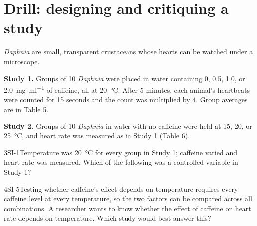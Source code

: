 \documentclass[11pt]{article}
\begin{document}
\section{Drill: designing and critiquing a study}

\textit{Daphnia} are small, transparent crustaceans whose hearts can be watched under a microscope.

\textbf{Study 1.} Groups of 10 \textit{Daphnia} were placed in water containing 0, 0.5, 1.0, or \SI{2.0}{\milli\gram\per\milli\litre} of caffeine, all at \SI{20}{\celsius}. After 5 minutes, each animal's heartbeats were counted for 15 seconds and the count was multiplied by 4. Group averages are in Table 5.

\textbf{Study 2.} Groups of 10 \textit{Daphnia} in water with no caffeine were held at 15, 20, or \SI{25}{\celsius}, and heart rate was measured as in Study 1 (Table 6).

\begin{minipage}[t]{0.48\linewidth}
\end{minipage}\hfill
\begin{minipage}[t]{0.48\linewidth}
\end{minipage}
\passageend

\begin{q}{3}{SI-1}{Temperature was \SI{20}{\celsius} for every group in Study 1; caffeine varied and heart rate was measured.}
Which of the following was a controlled variable in Study 1?
\end{q}

\begin{q}{4}{SI-5}{Testing whether caffeine's effect depends on temperature requires every caffeine level at every temperature, so the two factors can be compared across all combinations.}
A researcher wants to know whether the effect of caffeine on heart rate depends on temperature. Which study would best answer this?
\end{q}
\end{document}
